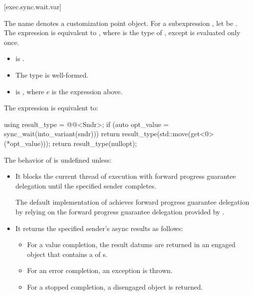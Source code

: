 [exec.sync.wait.var]{}

\pnum
The name  denotes
a customization point object.
For a subexpression ,
let  be .
The expression 
is equivalent to ,
where  is the type of
,
except  is evaluated only once.

\pnum
\mandates
\begin{itemize}
\item
{} is .
\item
The type 
is well-formed.
\item
{}
is , where $e$ is the  expression above.
\end{itemize}

\pnum
The expression  is equivalent to:
\begin{codeblock}
using result_type = @@<Sndr>;
if (auto opt_value = sync_wait(into_variant(sndr))) {
  return result_type(std::move(get<0>(*opt_value)));
}
return result_type(nullopt);
\end{codeblock}

\pnum
The behavior of 
is undefined unless:
\begin{itemize}
\item
It blocks the current thread of execution
with forward progress guarantee delegation
until the specified sender completes.
\begin{note}
The default implementation of  achieves
forward progress guarantee delegation by relying on
the forward progress guarantee delegation provided by .
\end{note}
\item
It returns the specified sender's async results as follows:
\begin{itemize}
\item
For a value completion,
the result datums are returned in an engaged  object
that contains a  of s.
\item
For an error completion, an exception is thrown.
\item
For a stopped completion, a disengaged  object is returned.
\end{itemize}
\end{itemize}

